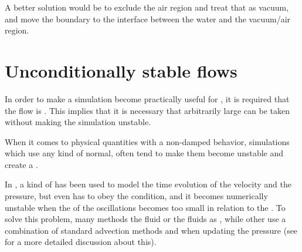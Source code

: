 A better solution would be to exclude the air region and treat that as vacuum, and move the boundary to the interface between the water and the vacuum/air region.

\section{Unconditionally stable flows}

In order to make a \FVM simulation become practically useful for , it is required that the flow is . This implies that it is necessary that arbitrarily large \timesteps can be taken without making the simulation unstable.

When it comes to physical quantities with a non-damped \oscillating behavior, simulations which use any kind of normal,  often tend to make them become unstable and create a .

In \thisprojectwork, a kind of  has been used to model the time evolution of the velocity and the pressure, but even  has to obey the \CFL condition, and it becomes numerically unstable when the \period of the oscillations becomes too small in relation to the \timestep. To solve this problem, many methods \approximate the fluid or the fluids as \incompressible, while other use a combination of standard advection methods and  when updating the pressure (see  for a more detailed discussion about this).


